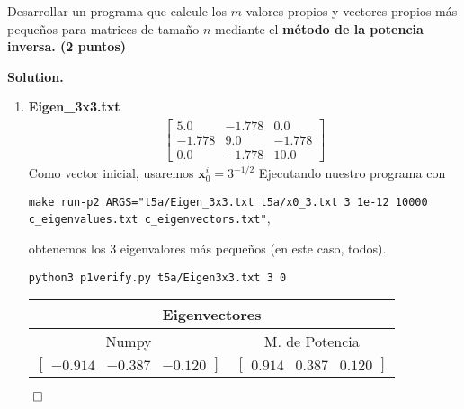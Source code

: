 \documentclass{article}
\theoremstyle{problemstyle}
\newenvironment{solution}{%
  \begin{mdframed}[linewidth=0.8pt,linecolor=Gray,backgroundcolor=Gray!5,roundcorner=5pt]%
  \noindent\textbf{Solution.}%
}{%
\hfill $ \qed $ 
  \end{mdframed}%
}
\begin{document}
\begin{problem}
Desarrollar un programa que calcule los $ m $ valores propios y vectores
propios más peque\~nos para matrices de tama\~no $ n $ mediante el
\textbf{m\'etodo de la potencia inversa. (2 puntos)}
\end{problem}

\begin{solution}
	\begin{enumerate}
		\item \textbf{Eigen\_3x3.txt}
		      \begin{align*}
			      \begin{bmatrix}
				      5.0    & -1.778 & 0.0    \\
				      -1.778 & 9.0    & -1.778 \\
				      0.0    & -1.778 & 10.0
			      \end{bmatrix}
		      \end{align*}
		      Como vector inicial, usaremos $ \mathbf{x}^i_0 = 3^{-1/2}$
		      Ejecutando nuestro programa con
		      \begin{center}
			      \texttt{make run-p2
				      ARGS="t5a/Eigen\_3x3.txt t5a/x0\_3.txt 3 1e-12 10000 c\_eigenvalues.txt c\_eigenvectors.txt"},
		      \end{center}
		      obtenemos los 3 eigenvalores m\'as peque\~nos (en este caso, todos).
		      \begin{center}
			      \texttt{python3 p1\textunderscore verify.py t5a/Eigen\textunderscore3x3.txt 3 0}
		      \end{center}
		      \begin{table}[H]
			      \begin{center}
				      \begin{tabular}{|c|c|}
					      \multicolumn{2}{c}{Eigenvectores}              \\
					      \hline
					      Numpy                     & M. de Potencia     \\
					      \hline
					      \rule{0pt}{1.5em}
					      $ \begin{bmatrix}
							        -0.914 & -0.387 & -0.120
						        \end{bmatrix} $ &
					      $ \begin{bmatrix}
							        0.914 & 0.387 & 0.120
						        \end{bmatrix} $                        \\
					      [0.5em]
					      \hline

\end{tabular}
\end{center}
\end{table}
\end{enumerate}
\end{solution}
\end{document}

